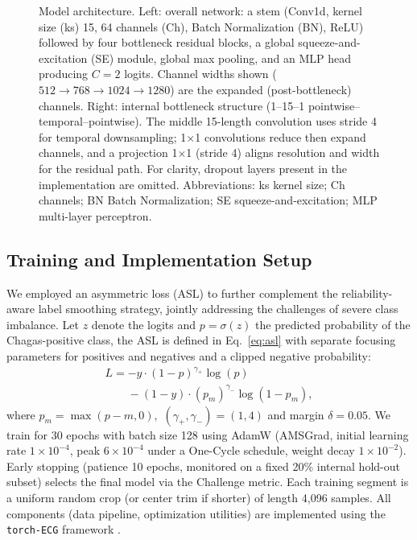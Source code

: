 \begin{figure*}
\centering

\caption{Model architecture. Left: overall network: a stem (Conv1d, kernel size (ks) 15, 64 channels (Ch), Batch Normalization (BN), ReLU) followed by four bottleneck residual blocks, a global squeeze-and-excitation (SE) module, global max pooling, and an MLP head producing $C = 2$ logits. Channel widths shown ($512 \to 768 \to 1024 \to 1280$) are the expanded (post-bottleneck) channels.
Right: internal bottleneck structure (1--15--1 pointwise--temporal--pointwise). The middle 15-length convolution uses stride 4 for temporal downsampling; 1$\times$1 convolutions reduce then expand channels, and a projection 1$\times$1 (stride 4) aligns resolution and width for the residual path. For clarity, dropout layers present in the implementation are omitted. Abbreviations: ks kernel size; Ch channels; BN Batch Normalization; SE squeeze-and-excitation; MLP multi-layer perceptron.}
\label{fig:model}
\end{figure*}


\subsection{Training and Implementation Setup}
\label{subsec:train}


We employed an asymmetric loss (ASL) \cite{ridnik2021asymmetric_loss} to further complement the reliability-aware label smoothing strategy, jointly addressing the challenges of severe class imbalance. Let $z$ denote the logits and $p=\sigma(z)$ the predicted probability of the Chagas-positive class, the ASL is defined in Eq.~\ref{eq:asl} with separate focusing parameters for positives and negatives and a clipped negative probability:
\begin{equation}
\label{eq:asl}
\begin{multlined}
L = -y \cdot (1-p)^{\gamma_{+}} \log(p) \\
\phantom{L = } - (1-y) \cdot (p_m)^{\gamma_{-}} \log(1-p_m),
\end{multlined}
\end{equation}
where $p_m = \max(p - m, 0),$ $(\gamma_{+},\gamma_{-})=(1,4)$ and margin $\delta=0.05$. We train for 30 epochs with batch size 128 using AdamW (AMSGrad, initial learning rate $1\times10^{-4}$, peak $6\times10^{-4}$ under a One-Cycle schedule, weight decay $1\times10^{-2}$). Early stopping (patience 10 epochs, monitored on a fixed 20\% internal hold-out subset) selects the final model via the Challenge metric. Each training segment is a uniform random crop (or center trim if shorter) of length 4,096 samples. All components (data pipeline, optimization utilities) are implemented using the \texttt{torch-ECG} framework \cite{torch_ecg_paper}.
